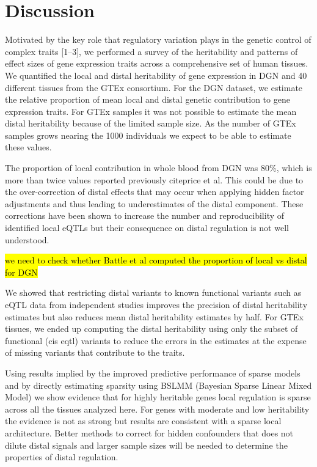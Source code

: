\documentclass[10pt,letterpaper]{article}
\begin{document}
\section*{Discussion}
Motivated by the key role that regulatory variation plays in the genetic control of complex traits {[}1--3{]}, we  
performed a survey of the heritability and patterns of effect sizes of gene expression traits across a comprehensive set of human tissues. We quantified the local and distal heritability of gene expression in DGN and 40 different tissues from the GTEx consortium. For the DGN dataset, we estimate the relative proportion of mean local and distal genetic contribution to gene expression traits. For GTEx samples it was not possible to estimate the mean distal heritability because of the limited sample size. As the number of GTEx samples grows nearing the 1000 individuals we expect to be able to estimate these values.

The proportion of local contribution in whole blood from DGN was 80\%, which is more than twice values reported previously cite{price et al}. This could be due to the over-correction of distal effects that may occur when applying hidden factor adjustments and thus leading to underestimates of the distal component. These corrections have been shown to increase the number and reproducibility of identified local eQTLs but their consequence on distal regulation is not well understood. 

\hl{we need to check whether Battle et al computed the proportion of local vs distal for DGN}

We showed that restricting distal variants to known functional variants such as eQTL data from independent studies improves the precision of distal heritability estimates but also reduces mean distal heritability estimates by half. For GTEx tissues, we ended up computing the distal heritability using only the subset of functional (cis eqtl) variants to reduce the errors in the estimates at the expense of missing variants that contribute to the traits.

Using results implied by the improved predictive performance of sparse models and by directly estimating sparsity using BSLMM (Bayesian Sparse Linear Mixed Model) we show evidence that for highly heritable genes local regulation is sparse across all the tissues analyzed here. For genes with moderate and low heritability the evidence is not as strong but results are consistent with a sparse local architecture. Better methods to correct for hidden confounders that does not dilute distal signals and larger sample sizes will be needed to determine the properties of distal regulation. 
\end{document}
